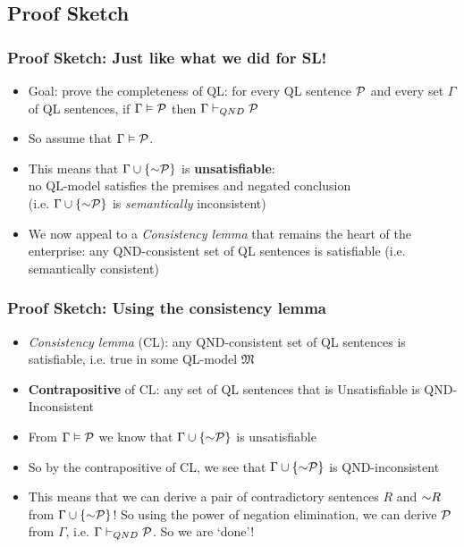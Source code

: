 \subsection{Proof Sketch}

\begin{frame}
\frametitle{Proof Sketch: Just like what we did for SL!}

\begin{itemize}[<+->]

\item Goal: prove the completeness of QL: for every QL sentence $\mathcal{P}$ and every set $\Gamma$ of QL sentences, if $\Gamma \vDash \mathcal{P}$ then $\Gamma \vdash_{QND} \mathcal{P}$

\item So assume that $\Gamma \vDash \mathcal{P}$. 

\item This means that $\Gamma \cup \{\enot \metav{P}\}$ is \textbf{\textcolor{OGlyallpink}{unsatisfiable}}:\\ no QL-model satisfies the premises and negated conclusion \\ (i.e. $\Gamma \cup \{\enot \metav{P}\}$ is \textit{semantically} inconsistent)

\item We now appeal to a \emph{Consistency lemma} that remains the heart of the enterprise: any QND-consistent set of QL sentences is satisfiable (i.e. semantically consistent)

\end{itemize}
\end{frame}

\begin{frame}
\frametitle{Proof Sketch: Using the consistency lemma}

\begin{itemize}[<+->]

\item \emph{Consistency lemma} (CL): any QND-consistent set of QL sentences is satisfiable, i.e. true in some QL-model $\mathfrak{M}$

\item \textbf{\textcolor{OGlyallpink}{Contrapositive}} of CL: any set of QL sentences that is \textcolor{OGlyallpink}{Un}satisfiable is QND-\textcolor{OGlyallpink}{In}consistent

\item From  $\Gamma \vDash \mathcal{P}$ we know that $\Gamma \cup \{\enot \metav{P}\}$ is unsatisfiable

\item So by the contrapositive of CL, we see that $\Gamma \cup \{\enot \metav{P}\}$ is QND-inconsistent

\item This means that we can derive a pair of contradictory sentences $R$ and $\enot R$ from $\Gamma \cup \{\enot \metav{P}\}$! So using the power of negation elimination, we can derive $\mathcal{P}$ from $\Gamma$, i.e. $\Gamma \vdash_{QND} \mathcal{P}$. So we are `done'! 

\end{itemize}
\end{frame}

